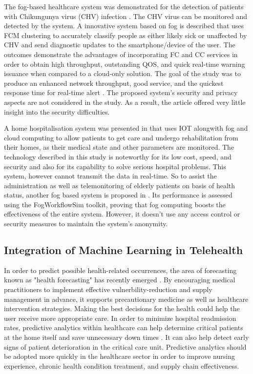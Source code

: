 \documentclass[10pt]{article}
\begin{document}
The fog-based healthcare system was demonstrated for the detection of patients with Chikungunya virus (CHV) infection \cite{15}. 
The CHV virus can be monitored and detected by the system. A innovative system based on fog is described that uses FCM clustering to accurately classify people as either likely sick or unaffected by CHV and send diagnostic updates to the smartphone/device of the user.
The outcomes demonstrate the advantages of incorporating FC and CC services in order to obtain high throughput, outstanding QOS, and quick real-time warning issuance when compared to a cloud-only solution. The goal of the study was to produce an enhanced network throughput, good service, and the quickest response time for real-time alert \cite{15}. The proposed system's security and privacy aspects are not considered in the study. As a result, the article offered very little insight into the security difficulties. 
\newline

A home hospitalisation system was presented in \cite{17} that uses IOT alongwith fog and cloud computing to allow patients to get care and undergo rehabilitation from their homes, as their medical state and other parameters are monitored. 
The technology described in this study is noteworthy for its low cost, speed, and security and also for its capability to solve serious hospital problems. This system, however cannot transmit the data in real-time. So to assist the administration as well as telemonitoring of elderly patients on basis of health status, another fog based system is proposed in \cite{18}. 
Its performance is assessed using the FogWorkflowSim toolkit, proving that fog computing boosts the effectiveness of the entire system. However, it doesn't use any access control or security measures to maintain the system's anonymity.
\newline
\newline


\subsection{Integration of Machine Learning in Telehealth}

In order to predict possible health-related occurrences, the area of forecasting known as "health forecasting" has recently emerged \cite{22}. By encouraging medical practitioners to implement effective vulnerbility-reduction and supply management in advance, it supports precautionary medicine as well as healthcare intervention strategies. 
Making the best decisions for the health could help the user receive more appropriate care. In order to minimize hospital readmission rates, predictive analytics within healthcare can help determine critical patients at the home itself and save unnecessary down times \cite{23}. It can also help detect early signs of patient deterioration in the critical care unit. 
Predictive analytics should be adopted more quickly in the healthcare sector in order to improve nursing experience, chronic health condition treatment, and supply chain effectiveness.  
\newline 
\newline
\end{document}
